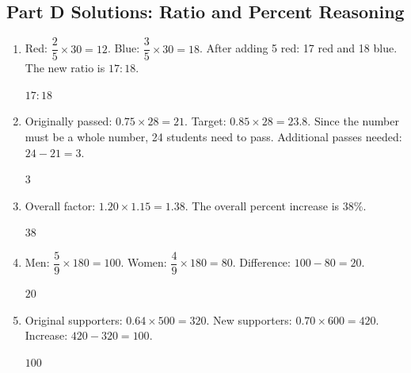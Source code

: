 \documentclass[14pt]{extarticle}
\begin{document}
\subsection*{Part D Solutions: Ratio and Percent Reasoning}
\begin{enumerate}
  \item Red: \(\dfrac{2}{5} \times 30 = 12\). Blue: \(\dfrac{3}{5} \times 30 = 18\). After adding 5 red: 17 red and 18 blue. The new ratio is \(17:18\).

  \(\boxed{17:18}\)

  \item Originally passed: \(0.75 \times 28 = 21\). Target: \(0.85 \times 28 = 23.8\). Since the number must be a whole number, 24 students need to pass. Additional passes needed: \(24 - 21 = 3\).

  \(\boxed{3}\)

  \item Overall factor: \(1.20 \times 1.15 = 1.38\). The overall percent increase is \(38\%\).

  \(\boxed{38}\)

  \item Men: \(\dfrac{5}{9} \times 180 = 100\). Women: \(\dfrac{4}{9} \times 180 = 80\). Difference: \(100 - 80 = 20\).

  \(\boxed{20}\)

  \item Original supporters: \(0.64 \times 500 = 320\). New supporters: \(0.70 \times 600 = 420\). Increase: \(420 - 320 = 100\).

  \(\boxed{100}\)
\end{enumerate}
\end{document}
